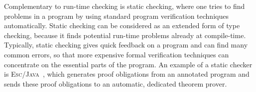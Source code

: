 \documentclass[a4paper]{llncs}
\newcommand{\escj}{\textsc{Esc/Java}}
\newcommand{\jass}{\textsc{Jass}}
\newcommand{\cPP}{\textsc{C/C}\nolinebreak\hspace{-.05em}\raisebox{.4ex}{\tiny\bf
+}\nolinebreak\hspace{-.10em}\raisebox{.4ex}{\tiny\bf +}}
\begin{document}




Complementary to run-time checking is static checking, where one tries
to find problems in a program by using standard program verification
techniques automatically. Static checking can be considered as an
extended form of type checking, because it finds potential run-time
problems already at compile-time. Typically, static checking gives
quick feedback on a program and can find many common errors, so that
more expensive formal verification techniques can concentrate on the
essential parts of the program. An example of a static checker is
\escj~\cite{LeinoNS00}, which generates proof obligations from an
annotated program and sends these proof obligations to an automatic,
dedicated theorem prover.  



\end{document}

